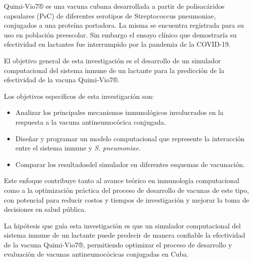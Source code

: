 Quimi-Vio7® es una vacuna cubana desarrollada a partir de polisacáridos capsulares (PsC) de diferentes serotipos de Streptococcus pneumoniae, conjugados a una proteína portadora. 
La misma se encuentra registrada para su uso en población preescolar. Sin embargo el ensayo clínico que demostraría su efectividad en lactantes fue interrumpido por la pandemia de la COVID-19.




\vspace{0.5cm}

El objetivo general de esta investigación es el desarrollo de un simulador computacional del sistema inmune de un lactante para la predicción de la efectividad de la vacuna Quimi-Vio7®.

Los objetivos específicos de esta investigación son:
\begin{itemize}
    \item Analizar los principales mecanismos inmunológicos involucrados en la respuesta a la vacuna antineumocócica conjugada.
    \item Diseñar y programar un modelo computacional que represente la interacción entre el sistema inmune y \textit{S. pneumoniae}.
    
    \item Comparar los resultadosdel simulador en diferentes esquemas de vacunación.
\end{itemize}

Este enfoque contribuye tanto al avance teórico en inmunología computacional como a la optimización práctica del proceso de desarrollo de vacunas de este tipo, con potencial para reducir costos y tiempos de investigación y mejorar la toma de decisiones en salud pública.

La hipótesis que guía esta investigación es que un simulador computacional del sistema inmune de un lactante puede predecir de manera confiable la efectividad de la vacuna Quimi-Vio7®, permitiendo optimizar el proceso de desarrollo y evaluación de vacunas antineumocócicas conjugadas en Cuba.

\vspace{0.5cm}

